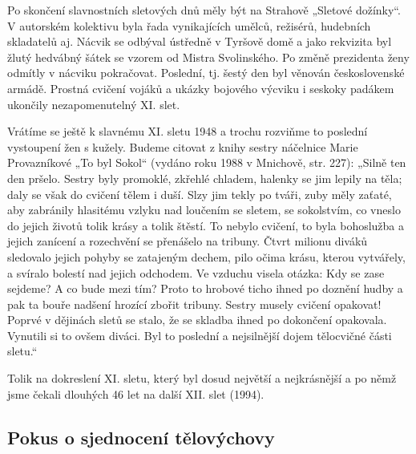 Po skončení slavnostních sletových dnů měly být na Strahově „Sletové
dožínky``. V autorském kolektivu byla řada vynikajících umělců,
režisérů, hudebních skladatelů aj. Nácvik se odbýval ústředně v Tyršově
domě a jako rekvizita byl žlutý hedvábný šátek se vzorem od Mistra
Svolinského. Po změně prezidenta ženy odmítly v nácviku pokračovat.
Poslední, tj. šestý den byl věnován československé armádě. Prostná
cvičení vojáků a ukázky bojového výcviku i seskoky padákem ukončily
nezapomenutelný XI. slet.

Vrátíme se ještě k slavnému XI. sletu 1948 a trochu rozviňme to poslední
vystoupení žen s kužely. Budeme citovat z knihy sestry náčelnice Marie
Provazníkové „To byl Sokol`` (vydáno roku 1988 v Mnichově, str. 227):
„Silně ten den pršelo. Sestry byly promoklé, zkřehlé chladem, halenky se
jim lepily na těla; daly se však do cvičení tělem i duší. Slzy jim tekly
po tváři, zuby měly zaťaté, aby zabránily hlasitému vzlyku nad loučením
se sletem, se sokolstvím, co vneslo do jejich životů tolik krásy a tolik
štěstí. To nebylo cvičení, to byla bohoslužba a jejich zanícení a
rozechvění se přenášelo na tribuny. Čtvrt milionu diváků sledovalo
jejich pohyby se zatajeným dechem, pilo očima krásu, kterou vytvářely, a
svíralo bolestí nad jejich odchodem. Ve vzduchu visela otázka: Kdy se
zase sejdeme? A co bude mezi tím? Proto to hrobové ticho ihned po
doznění hudby a pak ta bouře nadšení hrozící zbořit tribuny. Sestry
musely cvičení opakovat! Poprvé v dějinách sletů se stalo, že se skladba
ihned po dokončení opakovala. Vynutili si to ovšem diváci. Byl to
poslední a nejsilnější dojem tělocvičné části sletu.``

Tolik na dokreslení XI. sletu, který byl dosud největší a nejkrásnější a
po němž jsme čekali dlouhých 46 let na další XII. slet (1994).

\subsection{Pokus o sjednocení
tělovýchovy}\label{pokus-o-sjednocenuxed-tux11blovuxfdchovy}

